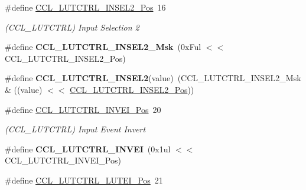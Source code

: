 \begin{DoxyCompactItemize}
\item 
\hypertarget{group___s_a_m_l21___c_c_l_ga2b985c6f56f3865f10ad2f81f8447410}{}\#define \hyperlink{group___s_a_m_l21___c_c_l_ga2b985c6f56f3865f10ad2f81f8447410}{C\+C\+L\+\_\+\+L\+U\+T\+C\+T\+R\+L\+\_\+\+I\+N\+S\+E\+L2\+\_\+\+Pos}~16\label{group___s_a_m_l21___c_c_l_ga2b985c6f56f3865f10ad2f81f8447410}

\begin{DoxyCompactList}\small\item\em (C\+C\+L\+\_\+\+L\+U\+T\+C\+T\+R\+L) Input Selection 2 \end{DoxyCompactList}\item 
\hypertarget{group___s_a_m_l21___c_c_l_ga3ee70c7fa67d17872e828267cfd8eb2e}{}\#define {\bfseries C\+C\+L\+\_\+\+L\+U\+T\+C\+T\+R\+L\+\_\+\+I\+N\+S\+E\+L2\+\_\+\+Msk}~(0x\+Ful $<$$<$ C\+C\+L\+\_\+\+L\+U\+T\+C\+T\+R\+L\+\_\+\+I\+N\+S\+E\+L2\+\_\+\+Pos)\label{group___s_a_m_l21___c_c_l_ga3ee70c7fa67d17872e828267cfd8eb2e}

\item 
\hypertarget{group___s_a_m_l21___c_c_l_ga1da470fb1151b7c8269edb437387190f}{}\#define {\bfseries C\+C\+L\+\_\+\+L\+U\+T\+C\+T\+R\+L\+\_\+\+I\+N\+S\+E\+L2}(value)~(C\+C\+L\+\_\+\+L\+U\+T\+C\+T\+R\+L\+\_\+\+I\+N\+S\+E\+L2\+\_\+\+Msk \& ((value) $<$$<$ \hyperlink{group___s_a_m_l21___c_c_l_ga2b985c6f56f3865f10ad2f81f8447410}{C\+C\+L\+\_\+\+L\+U\+T\+C\+T\+R\+L\+\_\+\+I\+N\+S\+E\+L2\+\_\+\+Pos}))\label{group___s_a_m_l21___c_c_l_ga1da470fb1151b7c8269edb437387190f}

\item 
\hypertarget{group___s_a_m_l21___c_c_l_ga72778567a0b9bddef619975d2ae08f6f}{}\#define \hyperlink{group___s_a_m_l21___c_c_l_ga72778567a0b9bddef619975d2ae08f6f}{C\+C\+L\+\_\+\+L\+U\+T\+C\+T\+R\+L\+\_\+\+I\+N\+V\+E\+I\+\_\+\+Pos}~20\label{group___s_a_m_l21___c_c_l_ga72778567a0b9bddef619975d2ae08f6f}

\begin{DoxyCompactList}\small\item\em (C\+C\+L\+\_\+\+L\+U\+T\+C\+T\+R\+L) Input Event Invert \end{DoxyCompactList}\item 
\hypertarget{group___s_a_m_l21___c_c_l_ga51f066285008bea41f44167cf3ee4582}{}\#define {\bfseries C\+C\+L\+\_\+\+L\+U\+T\+C\+T\+R\+L\+\_\+\+I\+N\+V\+E\+I}~(0x1ul $<$$<$ C\+C\+L\+\_\+\+L\+U\+T\+C\+T\+R\+L\+\_\+\+I\+N\+V\+E\+I\+\_\+\+Pos)\label{group___s_a_m_l21___c_c_l_ga51f066285008bea41f44167cf3ee4582}

\item 
\hypertarget{group___s_a_m_l21___c_c_l_ga2f90398b99ab7e79540c1a4d5362f3ab}{}\#define \hyperlink{group___s_a_m_l21___c_c_l_ga2f90398b99ab7e79540c1a4d5362f3ab}{C\+C\+L\+\_\+\+L\+U\+T\+C\+T\+R\+L\+\_\+\+L\+U\+T\+E\+I\+\_\+\+Pos}~21\label{group___s_a_m_l21___c_c_l_ga2f90398b99ab7e79540c1a4d5362f3ab}


\end{DoxyCompactItemize}
